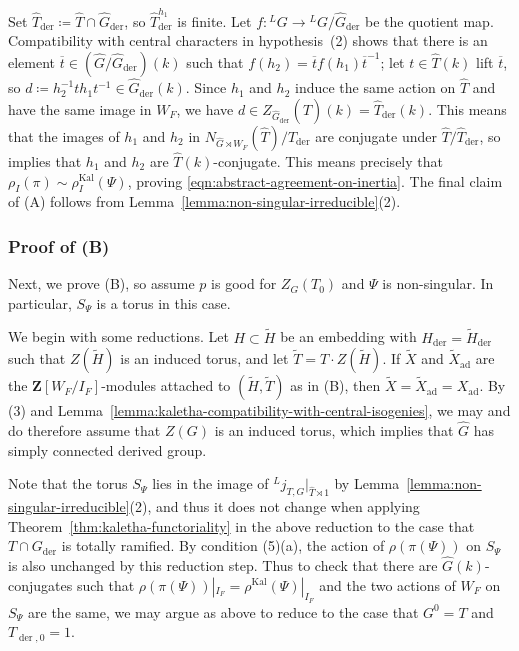 \documentclass[reqno]{amsart}
\numberwithin{equation}{subsection}
\newcommand{\wt}[1]{\widetilde{#1}}
\newcommand{\Z}{\mathbf{Z}}
\newcommand{\ol}[1]{\overline{#1}}
\newcommand{\wh}[1]{\widehat{#1}}
\newcommand{\co}{\colon}
\newcommand{\ld}{{}^L}
\DeclareMathOperator{\ad}{ad}
\DeclareMathOperator{\Kal}{Kal}
\DeclareMathOperator{\der}{der}
\theoremstyle{remark}
\numberwithin{equation}{subsection}
\numberwithin{figure}{subsection}
\begin{document}

Set $\wh{T}_{\der}\coloneqq \wh T\cap\wh G_{\der}$, so $\wh{T}_{\der}^{h_1}$ is finite. Let $f\co\ld G\to\ld G/\wh G_{\der}$ be the quotient map. Compatibility with central characters in hypothesis~(2) shows that there is an element $\ol t\in(\wh G/\wh G_{\der})(k)$ such that $f(h_2)=\ol t f(h_1)\ol t^{-1}$; let $t \in \wh T(k)$ lift $\ol t$, so $d\coloneqq h_2^{-1}t h_1t^{-1} \in \wh G_{\der}(k)$. Since $h_1$ and $h_2$ induce the same action on $\wh T$ and have the same image in $W_F$, we have $d\in Z_{\wh G_{\der}}(\wh T)(k) =\wh T_{\der}(k)$. This means that the images of $h_1$ and $h_2$ in $N_{\wh G\rtimes W_F}(\wh T)/\wh{T}_{\der}$ are conjugate under $\wh T/\wh{T}_{\der}$, so \cite[Lemma~5.3.4]{Cot26b} implies that $h_1$ and $h_2$ are $\wh T(k)$-conjugate. This means precisely that $\rho_I(\pi) \sim \rho_I^{\Kal}(\Psi)$, proving \eqref{eqn:abstract-agreement-on-inertia}. The final claim of (A) follows from Lemma~\ref{lemma:non-singular-irreducible}(2).

\subsubsection{Proof of (B)}
Next, we prove (B), so assume $p$ is good for $Z_G(T_0)$ and $\Psi$ is non-singular. In particular, $S_\Psi$ is a torus in this case.

We begin with some reductions. Let $H \subset \wt H$ be an embedding with $H_{\der} = \wt H_{\der}$ such that $Z(\wt H)$ is an induced torus, and let $\wt T = T \cdot Z(\wt H)$. If $\wt X$ and $\wt X_{\ad}$ are the $\Z[W_F/I_F]$-modules attached to $(\wt H, \wt T)$ as in (B), then $\wt X = \wt X_{\ad} = X_{\ad}$. By (3) and Lemma~\ref{lemma:kaletha-compatibility-with-central-isogenies}, we may and do therefore assume that $Z(G)$ is an induced torus, which implies that $\wh G$ has simply connected derived group.

Note that the torus $S_\Psi$ lies in the image of $\ld j_{T, G}|_{\wh T \rtimes 1}$ by Lemma~\ref{lemma:non-singular-irreducible}(2), and thus it does not change when applying Theorem~\ref{thm:kaletha-functoriality} in the above reduction to the case that $T \cap G_{\der}$ is totally ramified. By condition (5)(a), the action of $\rho(\pi(\Psi))$ on $S_\Psi$ is also unchanged by this reduction step. Thus to check that there are $\wh G(k)$-conjugates such that $\rho(\pi(\Psi))|_{I_F} = \rho^{\Kal}(\Psi)|_{I_F}$ and the two actions of $W_F$ on $S_\Psi$ are the same, we may argue as above to reduce to the case that $G^0 = T$ and $T_{\der,0} = 1$.
\end{document}

